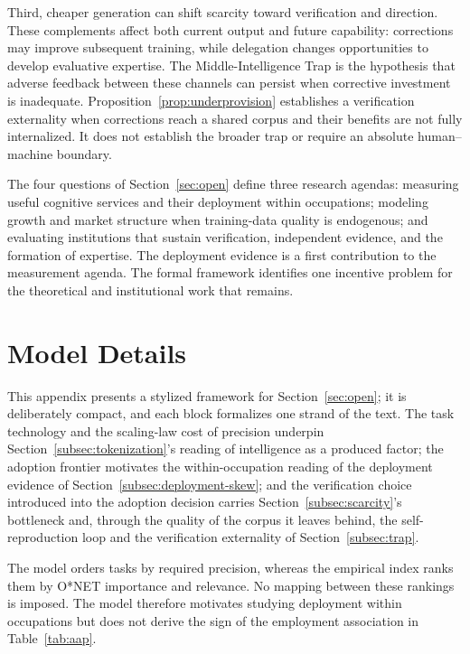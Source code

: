 \documentclass[12pt]{article}
\theoremstyle{plain}
\theoremstyle{definition}
\theoremstyle{remark}
\begin{document}
Third, cheaper generation can shift scarcity toward verification and
direction. These complements affect both current output and future
capability: corrections may improve subsequent training, while
delegation changes opportunities to develop evaluative expertise. The
Middle-Intelligence Trap is the hypothesis that adverse feedback
between these channels can persist when corrective investment is
inadequate. Proposition~\ref{prop:underprovision} establishes a
verification externality when corrections reach a shared corpus and
their benefits are not fully internalized. It does not establish the
broader trap or require an absolute human--machine boundary.

The four questions of Section~\ref{sec:open} define three research
agendas: measuring useful cognitive services and their deployment within
occupations; modeling growth and market structure when training-data
quality is endogenous; and evaluating institutions that sustain
verification, independent evidence, and the formation of expertise.
The deployment evidence is a first contribution to the measurement
agenda. The formal framework identifies one incentive problem for the
theoretical and institutional work that remains.

\printbibliography

\appendix
{}
\section{Model Details}\label{app:model}

This appendix presents a stylized framework for
Section~\ref{sec:open}; it is deliberately compact, and each block
formalizes one strand of the text. The task technology and the
scaling-law cost of precision underpin
Section~\ref{subsec:tokenization}'s reading of intelligence as a
produced factor; the adoption frontier motivates the within-occupation
reading of the deployment evidence of
Section~\ref{subsec:deployment-skew}; and the verification choice
introduced into the adoption decision carries
Section~\ref{subsec:scarcity}'s bottleneck and, through the quality of
the corpus it leaves behind, the self-reproduction loop and the
verification externality of Section~\ref{subsec:trap}.

The model orders tasks by required precision, whereas the empirical
index ranks them by O*NET importance and relevance. No mapping between
these rankings is imposed. The model therefore motivates studying
deployment within occupations but does not derive the sign of the
employment association in Table~\ref{tab:aap}.
\end{document}
